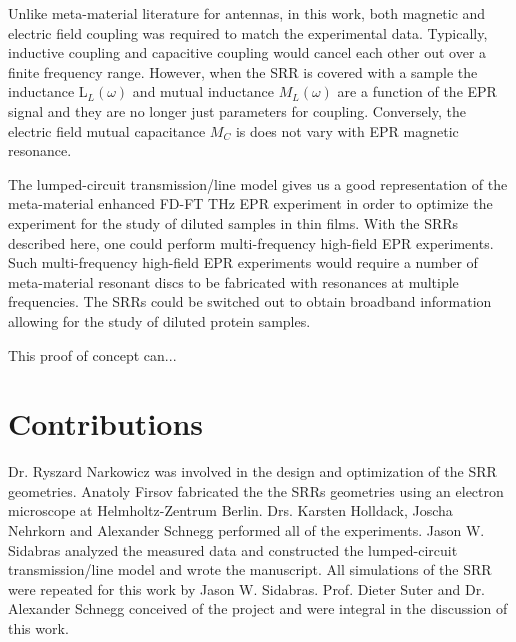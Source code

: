 Unlike meta-material literature for antennas, in this work, both magnetic and electric field coupling was required to match the experimental data. Typically, inductive coupling and capacitive coupling would cancel each other out over a finite frequency range. However, when the SRR is covered with a sample the inductance L$_L(\omega)$ and mutual inductance $M_L(\omega)$ are a function of the EPR signal and they are no longer just parameters for coupling. Conversely, the electric field mutual capacitance $M_C$ is does not vary with EPR magnetic resonance. 

The lumped-circuit transmission\-/line model gives us a good representation of the meta-material enhanced FD-FT THz EPR experiment in order to optimize the experiment for the study of diluted samples in thin films. With the SRRs described here, one could perform multi-frequency high-field EPR experiments. \cite{KRZYSTEK2006,Telser2014} Such multi-frequency high-field EPR experiments would require a number of meta-material resonant discs to be fabricated with resonances at multiple frequencies. The SRRs could be switched out to obtain broadband information allowing for the study of diluted protein samples.

This proof of concept can... \cite{ZhangMetasurfaces}

 
\section*{Contributions}
Dr. Ryszard Narkowicz was involved in the design and optimization of the SRR geometries. Anatoly Firsov fabricated the the SRRs geometries using an electron microscope at Helmholtz-Zentrum Berlin. Drs. Karsten Holldack, Joscha Nehrkorn and Alexander Schnegg performed all of the experiments. Jason W. Sidabras analyzed the measured data and constructed the lumped-circuit transmission\-/line model and wrote the manuscript. All simulations of the SRR were repeated for this work by Jason W. Sidabras. Prof. Dieter Suter and Dr. Alexander Schnegg conceived of the project and were integral in the discussion of this work.

{\renewcommand{\bibsection}{\clearpage\section*{\bibname}\markboth{\bibname}{\bibname}}
\renewcommand{\bibname}{CHAPTER 4. REFERENCES}


}